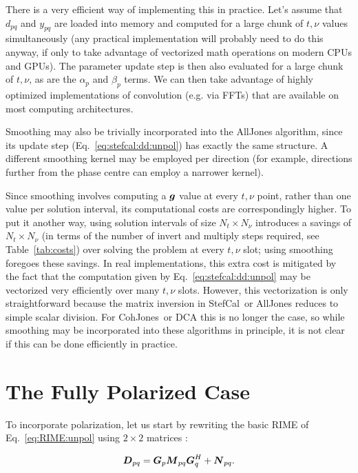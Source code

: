 \documentclass[useAMS,usenatbib]{mn2e}
\newcommand{\vecg}{\bmath{g}}
\newcommand{\mat}[1]{{\bmath{#1}}}
\newcommand{\DD}{\mat{D}}
\newcommand{\MM}{\mat{M}}
\newcommand{\GG}{\mat{G}}
\newcommand{\COH}{{\sc CohJones}}
\newcommand{\StefCal}{{\sc StefCal}}
\begin{document}
There is a very efficient way of implementing this in practice. Let's assume that $d_{pq}$ and $y_{pq}$ are loaded into memory 
and computed for a large chunk of $t,\nu$ values simultaneously (any practical implementation will probably need to do this anyway, 
if only to take advantage of vectorized math operations on modern CPUs and GPUs). The parameter update step is then also evaluated
for a large chunk of $t,\nu$, as are the $\alpha_p$ and $\beta_p$ terms. We can then take advantage of highly optimized 
implementations of convolution (e.g. via FFTs) that are available on most computing architectures. 

Smoothing may also be trivially incorporated into the {\sc AllJones} algorithm, since its update step (Eq.~\ref{eq:stefcal:dd:unpol}) 
has exactly the same structure. A different smoothing kernel may be employed per direction (for example, directions further from 
the phase centre can employ a narrower kernel). 

Since smoothing involves computing a $\vecg$ value at every $t,\nu$ point, rather than one value per
solution interval, its computational costs are correspondingly higher. To put it another way, using solution intervals of 
size $N_t\times N_\nu$ introduces a savings of $N_t\times N_\nu$ (in terms of the number of invert and multiply steps required, see 
Table~\ref{tab:costs}) over solving the problem at every $t,\nu$ slot; using smoothing foregoes these savings.
In real implementations, this extra cost is mitigated 
by the fact that  the computation given by Eq.~\ref{eq:stefcal:dd:unpol} may be vectorized very efficiently over many $t,\nu$ slots.
However, this vectorization is only straightforward because the matrix inversion in \StefCal\ or {\sc AllJones} reduces to simple 
scalar division.  For \COH\ or DCA this is no longer the case, so while smoothing may be incorporated into these algorithms 
in principle, it is not clear if this can be done efficiently in practice.

\section{The Fully Polarized Case}
\label{sec:pol}

To incorporate polarization, let us start by rewriting the basic RIME of Eq.~\ref{eq:RIME:unpol} using $2\times 2$ matrices 
\citep[a full derivation may be found in][]{RRIME1}:

\begin{equation}
\label{eq:RIME:pol}
\DD_{pq} = \GG_p \MM_{pq} \GG^H_q + \mat{N}_{pq}.
\end{equation}
\end{document}
